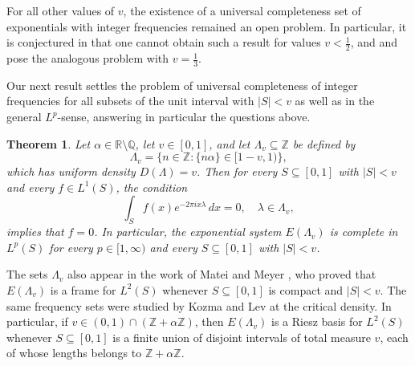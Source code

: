 \documentclass[reqno,a4paper,12pt]{amsart}
\numberwithin{equation}{section}
\newtheorem{theorem}[definition]{Theorem}
\def\Z{{\mathbb Z}}
\def\R{{\mathbb R}}
\def\Q{{\mathbb Q}}
\newcommand\1{\mathds{1}}
\begin{document}
For all other values of $v$, the existence of a universal completeness set of exponentials with integer frequencies remained an open problem. In particular, it is conjectured in \cite[p. 59]{OlevskiiUlanovskii2016} that one cannot obtain such a result for values $v < \frac12$, and \cite[Open Question 6.5]{OlevskiiUlanovskii2016} and \cite[Section 12]{OlevskiiUlanovskii2020} pose the analogous problem with $v=\frac{1}{3}$.

Our next result settles the problem of universal completeness of integer frequencies for all subsets of the unit interval with $|S|<v$ as well as in the general $L^p$-sense, answering in particular the questions above.
\begin{theorem}\label{thm:integer}
    Let $\alpha \in \R \setminus \Q$, let $v \in [0,1]$, and let $\Lambda_v \subseteq \Z$ be defined by
    $$
    \Lambda_v=\{n\in\Z:\{n\alpha\}\in[1-v,1)\},
    $$
    which has uniform density $D(\Lambda)=v$. Then for every $S \subseteq [0,1]$ with $|S|<v$ and every $f \in L^1(S)$, the condition
    $$
    \int_S f(x) e^{-2\pi i x \lambda} \, dx = 0, \quad \lambda \in \Lambda_v,
    $$
    implies that $f=0$. In particular, the exponential system $E(\Lambda_v)$ is complete in $L^p(S)$ for every $p \in [1,\infty)$ and every $S \subseteq [0,1]$ with $|S| < v$.
\end{theorem}

The sets $\Lambda_v$ also appear in the work of Matei and Meyer \cite{MateiMeyer2009}, who proved that $E(\Lambda_v)$ is a frame for $L^2(S)$ whenever $S\subseteq[0,1]$ is compact and $|S|<v$. The same frequency sets were studied by Kozma and Lev \cite{KozmaLev2011} at the critical density. In particular, if $v\in(0,1)\cap(\Z+\alpha\Z)$, then $E(\Lambda_v)$ is a Riesz basis for $L^2(S)$ whenever $S\subseteq[0,1]$ is a finite union of disjoint intervals of total measure $v$, each of whose lengths belongs to $\Z+\alpha\Z$. 
\end{document}
